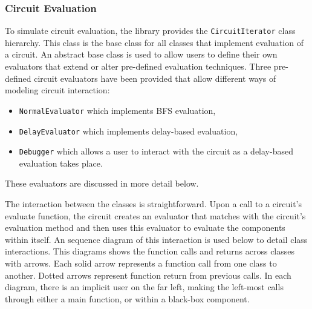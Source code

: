 \documentclass{article}
\newcommand{\ClassName}[1]{\texttt{#1}}
\begin{document}
\subsubsection{Circuit Evaluation}

To simulate circuit evaluation, the library provides the \ClassName{CircuitIterator} class hierarchy. This class is the base class for all classes that implement evaluation of a circuit.  An abstract base class is used to allow users to define their own evaluators that extend or alter pre-defined evaluation techniques. Three pre-defined circuit evaluators have been provided that allow different ways of modeling circuit interaction:

\begin{itemize}
\item \ClassName{NormalEvaluator} which implements BFS evaluation,
\item \ClassName{DelayEvaluator} which implements delay-based evaluation,
\item \ClassName{Debugger} which allows a user to interact with the circuit as a delay-based evaluation takes place.
\end{itemize}

These evaluators are discussed in more detail below.

The interaction between the classes is straightforward. Upon a call to a circuit's evaluate function, the circuit creates an evaluator that matches with the circuit’s evaluation method and then uses this evaluator to evaluate the components within itself. An sequence diagram of this interaction is used below to detail class interactions. This diagrams shows the function calls and returns across classes with arrows. Each solid arrow represents a function call from one class to another. Dotted arrows represent function return from previous calls. In each diagram, there is an implicit user on the far left, making the left-most calls through either a main function, or within a black-box component.
\end{document}
